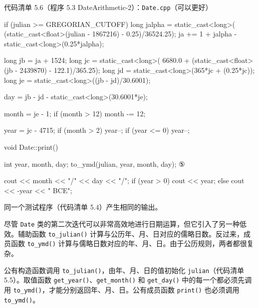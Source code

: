 \begin{codeboxt}{代码清单 5.6（程序 5.3 DateArithmetic-2）：\texttt{Date.cpp}（可以更好）}
{    if (julian >= GREGORIAN_CUTOFF)
    {
        long jalpha = static_cast<long>(
            (static_cast<float>(julian - 1867216) - 0.25)/36524.25);
        ja += 1 + jalpha - static_cast<long>(0.25*jalpha);
    }

    long jb = ja + 1524;
    long jc = static_cast<long>(
        6680.0 + (static_cast<float>(jb - 2439870) - 122.1)/365.25);
    long jd = static_cast<long>(365*jc + (0.25*jc));
    long je = static_cast<long>((jb - jd)/30.6001);

    day = jb - jd - static_cast<long>(30.6001*je);

    month = je - 1;
    if (month > 12) month -= 12;

    year = jc - 4715;
    if (month > 2) year--;
    if (year <= 0) year--;
}

void Date::print()
{
    int year, month, day;
    to_ymd(julian, year, month, day);                               ⑤

    cout << month << "/" << day << "/";
    if (year > 0) cout <<  year;
    else          cout << -year << " BCE";
}
\end{codeboxt}
\par
{}\par
{}\par
{}\par
{}\par

同一个测试程序（代码清单 5.4）产生相同的输出。

尽管 \texttt{Date} 类的第二次迭代可以非常高效地进行日期运算，但它引入了另一种低效。辅助函数 \texttt{to\_\allowbreak{}julian(\allowbreak{})\allowbreak{}} 计算与公历年、月、日对应的儒略日数。反过来，成员函数 \texttt{to\_ymd()} 计算与儒略日数对应的年、月、日。由于公历规则，两者都很复杂。

公有构造函数调用 \texttt{to\_\allowbreak{}julian(\allowbreak{})\allowbreak{}}，由年、月、日的值初始化 \texttt{julian}（代码清单 5.5）。取值函数 \texttt{get\_\allowbreak{}year(\allowbreak{})\allowbreak{}}、\texttt{get\_\allowbreak{}month(\allowbreak{})\allowbreak{}} 和 \texttt{get\_\allowbreak{}day(\allowbreak{})\allowbreak{}} 中的每一个都必须先调用 \texttt{to\_ymd()}，才能分别返回年、月、日。公有成员函数 \texttt{print()} 也必须调用 \texttt{to\_ymd()}。

